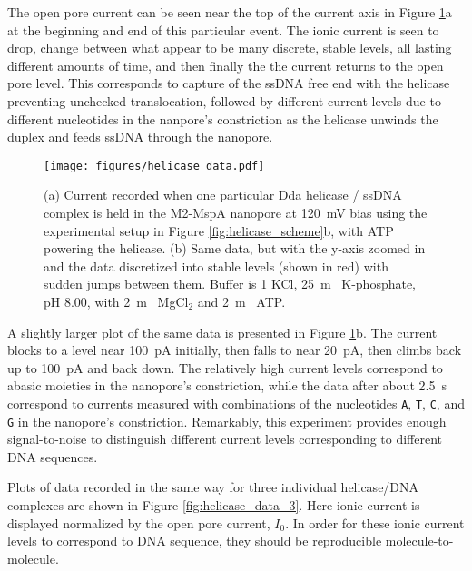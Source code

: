 The open pore current can be seen near the top of the current axis in Figure \ref{fig:helicase_data}a at the beginning and end of this particular event.  The ionic current is seen to drop, change between what appear to be many discrete, stable levels, all lasting different amounts of time, and then finally the the current returns to the open pore level.  This corresponds to capture of the ssDNA free end with the helicase preventing unchecked translocation, followed by different current levels due to different nucleotides in the nanpore's constriction as the helicase unwinds the duplex and feeds ssDNA through the nanopore.

\begin{figure}[H]
\begin{centering}
\texttt{[image: figures/helicase\_data.pdf]}
\caption[Data for helicase stepping along DNA]{(a) Current recorded when one particular Dda helicase / ssDNA complex is held in the M2-MspA nanopore at \SI{120}{\mV} bias using the experimental setup in Figure \ref{fig:helicase_scheme}b, with ATP powering the helicase.  (b) Same data, but with the y-axis zoomed in and the data discretized into stable levels (shown in red) with sudden jumps between them.  Buffer is \SI{1}{\Molar} KCl, \SI{25}{\m\Molar} K-phosphate, pH \num{8.00}, with \SI{2}{\m\Molar} MgCl$_2$ and \SI{2}{\m\Molar} ATP.}
\label{fig:helicase_data}
\end{centering}
\end{figure}

A slightly larger plot of the same data is presented in Figure \ref{fig:helicase_data}b.  The current blocks to a level near \SI{100}{\pA} initially, then falls to near \SI{20}{\pA}, then climbs back up to \SI{100}{\pA} and back down.  The relatively high current levels correspond to abasic moieties in the nanopore's constriction, while the data after about \SI{2.5}{\s} correspond to currents measured with combinations of the nucleotides \texttt{A}, \texttt{T}, \texttt{C}, and \texttt{G} in the nanopore's constriction.  Remarkably, this experiment provides enough signal-to-noise to distinguish different current levels corresponding to different DNA sequences.

Plots of data recorded in the same way for three individual helicase/DNA complexes are shown in Figure \ref{fig:helicase_data_3}.  Here ionic current is displayed normalized by the open pore current, $I_0$.  In order for these ionic current levels to correspond to DNA sequence, they should be reproducible molecule-to-molecule.

